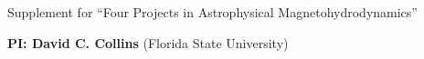 \documentclass[11pt]{NSF}  %
\begin{document}
\begin{centering}
\begin{LARGE}
Supplement for ``Four Projects in Astrophysical Magnetohydrodynamics''
\end{LARGE}


\vspace{2mm}
{\bf PI: David C. Collins} (Florida State University)

\end{centering}
\pagestyle{plain}


\def\request{151,000}
\def\requestdisk{76,800}
\def\forcing{\ensuremath{\eta}}
\def\mach{\ensuremath{\mathcal{M}_{S}}}
\def\xis{0}
\def\xic{1}
\def\tdyn{\ensuremath{t_{\rm{dyn}}}}
\def\Mach{\ensuremath{M_{S}}}
\def\Nu{\ensuremath{N_U}}







%


%
\end{document}
